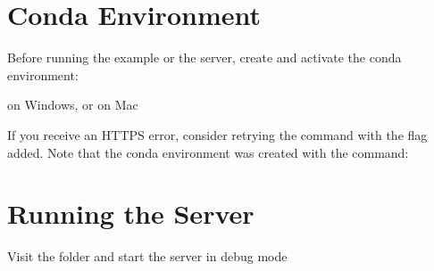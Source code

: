 \documentclass[letterpaper,10pt,english]{sphinxmanual}
\begin{document}
\section{Conda Environment}
\label{\detokenize{getting-started:conda-environment}}
Before running the example or the server, create and activate the conda
environment:

\begin{sphinxVerbatim}[commandchars=\\\{\}]
    \PYGZbs{}
  
\end{sphinxVerbatim}

on Windows, or on Mac

\begin{sphinxVerbatim}[commandchars=\\\{\}]
    
  
\end{sphinxVerbatim}

If you receive an HTTPS error, consider retrying the command with the  flag added.
Note that the conda environment was created with the command:

\begin{sphinxVerbatim}[commandchars=\\\{\}]
              
\end{sphinxVerbatim}


\section{Running the Server}
\label{\detokenize{getting-started:running-the-server}}
Visit the folder  and start the server in debug mode

\begin{sphinxVerbatim}[commandchars=\\\{\}]
 \PYGZbs{}
\end{sphinxVerbatim}
\end{document}
